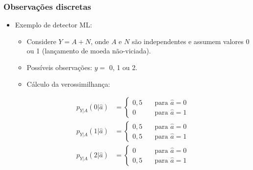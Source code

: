 \begin{frame}
	\frametitle{Observações discretas}

	\begin{itemize}
	    \item Exemplo de detector ML:
	    \begin{itemize}
	      \item Considere $Y= A + N$, onde $A$ e $N$ são independentes e assumem valores 0 ou 1 (lançamento de moeda não-viciada).
	      \item Possíveis observações: $y=$ 0, 1 ou 2.
	      \item Cálculo da verossimilhança:
	    \end{itemize}
	    \begin{align*}
		p_{Y|A}(0|\hat{a}) &= \begin{cases}
					0,5  \quad &\text{para } \hat{a}=0 \\
					0 \quad &\text{para } \hat{a}=1
		                      \end{cases} \\
		p_{Y|A}(1|\hat{a}) &= \begin{cases}
					0,5  \quad &\text{para } \hat{a}=0 \\
					0,5 \quad &\text{para } \hat{a}=1
		                      \end{cases} \\
		p_{Y|A}(2|\hat{a}) &= \begin{cases}
					0  \quad &\text{para } \hat{a}=0 \\
					0,5 \quad &\text{para } \hat{a}=1
		                      \end{cases}
	    \end{align*}


	\end{itemize}			
\end{frame}

